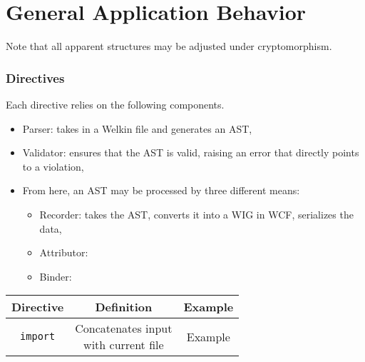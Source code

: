 \section{General Application Behavior}

Note that all apparent structures may be adjusted under cryptomorphism.
\subsubsection*{Directives}
Each directive relies on the following components.
\begin{itemize}
  \item Parser: takes in a Welkin file and generates an AST,
  \item Validator: ensures that the AST is valid, raising an error that directly points to a violation,
  \item From here, an AST may be processed by three different means:
		\begin{itemize}
		  \item Recorder: takes the AST, converts it into a WIG in WCF, serializes the data,
		  \item Attributor: %
		  \item Binder:
		\end{itemize}
\end{itemize}
\begin{center}
  \begin{tabular}{| c | c | c |}
	Directive & Definition & Example \\
	\hline
	\texttt{import} & \makecell{Concatenates input \\ with current file} & Example

  \end{tabular}
\end{center}


